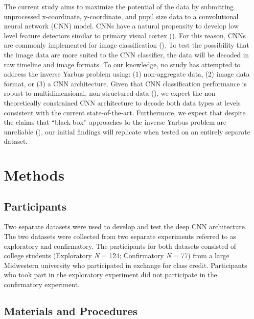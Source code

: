 \documentclass[
  english,
  man]{apa6}
\begin{document}
The current study aims to maximize the potential of the data by submitting unprocessed x-coordinate, y-coordinate, and pupil size data to a convolutional neural network (CNN) model. CNNs have a natural propensity to develop low level feature detectors similar to primary visual cortex (). For this reason, CNNs are commonly implemented for image classification (). To test the possibility that the image data are more suited to the CNN classifier, the data will be decoded in raw timeline and image formats. To our knowledge, no study has attempted to address the inverse Yarbus problem using: (1) non-aggregate data, (2) image data format, or (3) a CNN architecture. Given that CNN classification performance is robust to multidimensional, non-structured data (), we expect the non-theoretically constrained CNN architecture to decode both data types at levels consistent with the current state-of-the-art. Furthermore, we expect that despite the claims that \enquote{black box} approaches to the inverse Yarbus problem are unreliable (), our initial findings will replicate when tested on an entirely separate dataset.

\section{Methods}

\subsection{Participants}

Two separate datasets were used to develop and test the deep CNN architecture. The two datasets were collected from two separate experiments referred to as exploratory and confirmatory. The participants for both datasets consisted of college students (Exploratory \emph{N} = 124; Confirmatory \emph{N} = 77) from a large Midwestern university who participated in exchange for class credit. Participants who took part in the exploratory experiment did not participate in the confirmatory experiment.

\subsection{Materials and Procedures}
\end{document}
